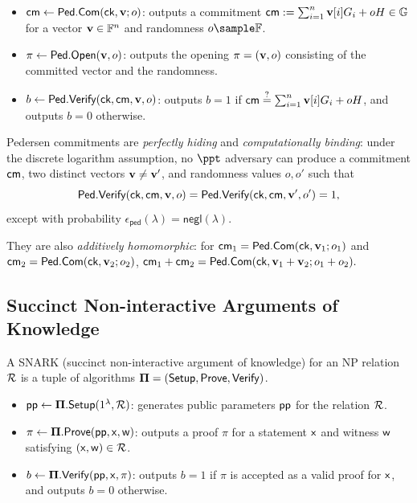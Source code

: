 \begin{itemize}
\item $\textsf{cm} \gets \textsf{Ped.Com}({\textsf{ck}},\mathbf{v};o)$:
outputs a commitment $\textsf{cm} := \sum_{i=1}^{n}\mathbf{v}[i]G_i + oH \in \mathbb{G}$ for a vector $\mathbf{v}\in\mathbb{F}^n$ and randomness $o\sample\mathbb{F}$.

\item $\pi \gets \textsf{Ped.Open}(\mathbf{v},o)$:
outputs the opening $\pi=(\mathbf{v},o)$ consisting of the committed vector and the randomness.

\item $b \gets \textsf{Ped.Verify}({\textsf{ck}},\textsf{cm},\mathbf{v},o)$:
outputs $b=1$ if $\textsf{cm} \stackrel{?}{=} \sum_{i=1}^{n}\mathbf{v}[i]G_i + oH$,
and outputs $b=0$ otherwise.
\end{itemize}

Pedersen commitments are \emph{perfectly hiding} and
\emph{computationally binding}: under the discrete logarithm assumption,
no $\ppt$ adversary can produce a commitment $\textsf{cm}$, two distinct vectors
$\mathbf{v}\neq\mathbf{v}'$, and randomness values $o,o'$ such that
\[
\textsf{Ped.Verify}({\textsf{ck}},\textsf{cm},\mathbf{v},o) = \textsf{Ped.Verify}({\textsf{ck}},\textsf{cm},\mathbf{v}',o') = 1,
\]
except with probability
$\epsilon_{\mathsf{ped}}(\lambda)=\mathsf{negl}(\lambda)$.

They are also \emph{additively homomorphic}: for
$\textsf{cm}_1=\textsf{Ped.Com}({\textsf{ck}},\mathbf{v}_1;o_1)$ and
$\textsf{cm}_2=\textsf{Ped.Com}({\textsf{ck}},\mathbf{v}_2;o_2)$, $\textsf{cm}_1+\textsf{cm}_2 = \textsf{Ped.Com}({\textsf{ck}},\mathbf{v}_1+\mathbf{v}_2;o_1+o_2).$


\subsection{Succinct Non-interactive Arguments of Knowledge}
\label{sec:prelim-snark}

A SNARK (succinct non-interactive argument of knowledge) for an NP relation
${\mathcal{R}}$ is a tuple of algorithms ${\bf \Pi}=({\sf Setup},{\sf Prove},{\sf Verify})$.

\begin{itemize}
\item $\textsf{pp} \gets {\bf \Pi}.{\sf Setup}(1^\lambda,{\mathcal{R}})$:
generates public parameters $\textsf{pp}$ for the relation ${\mathcal{R}}$.

\item $\pi \gets {\bf \Pi}.{\sf Prove}(\textsf{pp},\mathsf{x},\mathsf{w})$:
outputs a proof $\pi$ for a statement $\mathsf{x}$ and witness $\mathsf{w}$ satisfying $(\mathsf{x},\mathsf{w})\in{\mathcal{R}}$.

\item $b \gets {\bf \Pi}.{\sf Verify}(\textsf{pp},\mathsf{x},\pi)$:
outputs $b=1$ if $\pi$ is accepted as a valid proof for $\mathsf{x}$, and outputs $b=0$ otherwise.
\end{itemize}

